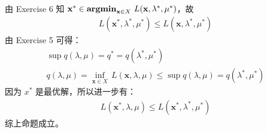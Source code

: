 \documentclass[11pt,letter,notitlepage]{article}
\DeclareMathOperator*{\argmin}{\bf argmin}
\begin{document}
\begin{solution}
	\heiti
	\ \\
	由 Exercise 6 知 $\mathbf{x}^*\in\argmin_{\mathbf{x}\in X}\,L(\mathbf{x},\lambda^*,\mu^*)$，故
	\begin{align*}
		L(\mathbf{x}^*,\lambda^*,\mu^*) \leqslant L(\mathbf{x},\lambda^*,\mu^*)
	\end{align*}
	由 Exercise 5 可得：
	\begin{align*}
		\sup q(\lambda,\mu) = q^* = q(\lambda^*,\mu^*)\\
		q(\lambda,\mu) = \inf_{\mathbf{x}\in X}\, L(\mathbf{x},\lambda,\mu) \leqslant \sup q(\lambda,\mu) = q(\lambda^*,\mu^*)
	\end{align*}
	因为 $x^*$ 是最优解，所以进一步有：
	\begin{align*}
		L(\mathbf{x}^*,\lambda,\mu) \leqslant L(\mathbf{x}^*,\lambda^*,\mu^*)
	\end{align*}
	综上命题成立。
\end{solution}
\end{document}
